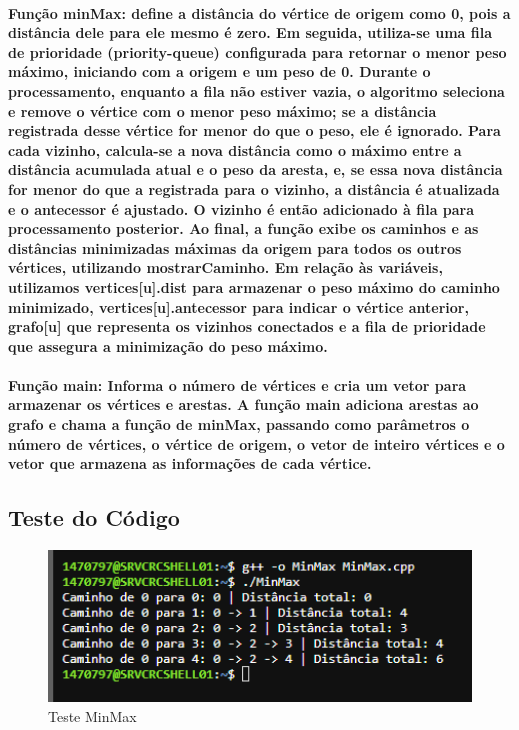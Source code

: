 \documentclass{article}
\begin{document}
\paragraph{Função minMax: define a distância do vértice de origem como 0, pois a distância dele para ele mesmo é zero. Em seguida, utiliza-se uma fila de prioridade (priority-queue) configurada para retornar o menor peso máximo, iniciando com a origem e um peso de 0. Durante o processamento, enquanto a fila não estiver vazia, o algoritmo seleciona e remove o vértice com o menor peso máximo; se a distância registrada desse vértice for menor do que o peso, ele é ignorado. Para cada vizinho, calcula-se a nova distância como o máximo entre a distância acumulada atual e o peso da aresta, e, se essa nova distância for menor do que a registrada para o vizinho, a distância é atualizada e o antecessor é ajustado. O vizinho é então adicionado à fila para processamento posterior. Ao final, a função exibe os caminhos e as distâncias minimizadas máximas da origem para todos os outros vértices, utilizando mostrarCaminho. Em relação às variáveis, utilizamos vertices[u].dist para armazenar o peso máximo do caminho minimizado, vertices[u].antecessor para indicar o vértice anterior, grafo[u] que representa os vizinhos conectados e a fila de prioridade que assegura a minimização do peso máximo.}

\paragraph{Função main: Informa o número de vértices e cria um vetor para armazenar os vértices e arestas. A função main adiciona arestas ao grafo e chama a função de minMax, passando como parâmetros o número de vértices, o vértice de origem, o vetor de inteiro vértices e o vetor que armazena as informações de cada vértice.}

\subsection{ Teste do Código }

\begin{figure}[h]
    \centering
    \includegraphics[width=1\textwidth]{imgs/MinMax.PNG}
    \caption{Teste MinMax}
    \label{fig:corr}
\end{figure}
\
\end{document}
